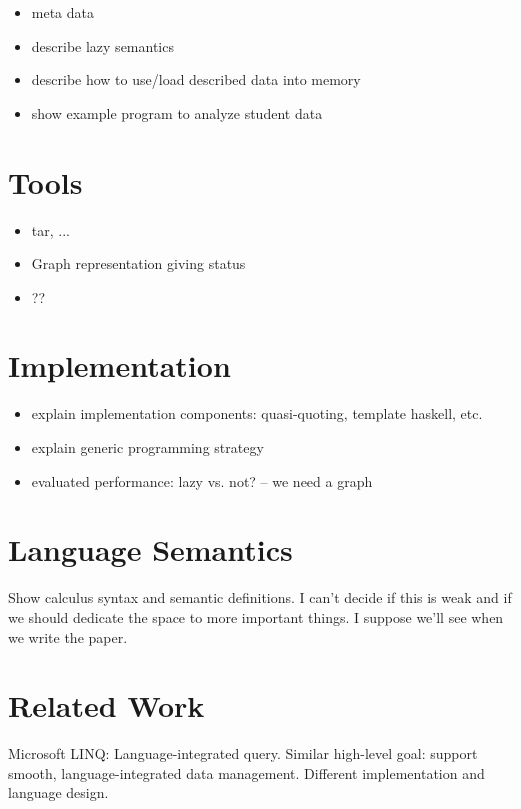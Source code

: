 \documentclass[natbib]{sigplanconf}
\begin{document}
\begin{itemize}
\item meta data
\item describe lazy semantics
\item describe how to use/load described data into memory
\item show example program to analyze student data
\end{itemize}

\section{Tools}
\label{sec:tools}
\begin{itemize}
\item tar, ...
\item Graph representation giving status
\item ??
\end{itemize}


\section{Implementation}

\begin{itemize}
\item explain implementation components: quasi-quoting, template haskell, etc.
\item explain generic programming strategy
\item evaluated performance: lazy vs. not? -- we need a graph
\end{itemize}

\section{Language Semantics}
\label{sec:exp}

Show calculus syntax and semantic definitions.  I can't decide if this
is weak and if we should dedicate the space to more important things.
I suppose we'll see when we write the paper.

\section{Related Work}
\label{sec:related}

Microsoft LINQ: Language-integrated query.  Similar high-level goal:
support smooth, language-integrated data management.  Different 
implementation and language design.
\end{document}
